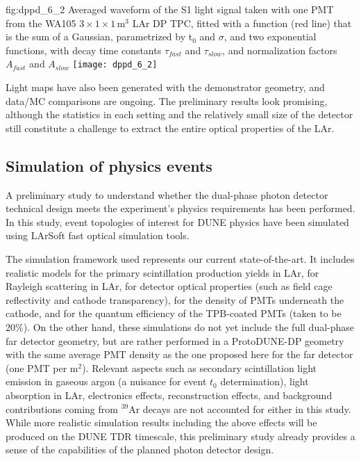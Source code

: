 \begin{dunefigure}{fig:dppd_6_2}
{Averaged waveform of the S1 light signal taken with one PMT from the WA105 $3\times1\times1$\,m$^3$ LAr DP TPC, fitted with a function (red line) that is the sum of a Gaussian, parametrized by t$_0$ and $\sigma$, and two exponential functions, with decay time constants $\tau_{fast}$ and $\tau_{slow}$, and normalization factors $A_{fast}$ and $A_{slow}$}
\texttt{[image: dppd\_6\_2]}
\end{dunefigure}

Light maps have also been generated with the demonstrator geometry, and data/MC comparisons are ongoing. The preliminary results look promising, although the statistics in each setting and the relatively small size of the detector still constitute a challenge to extract the entire optical properties of the LAr.


\subsection{Simulation of physics events}
\label{sec:fddp-pd-6.3}

A preliminary study to understand whether the dual-phase photon detector technical design meets the experiment's physics requirements has been performed. In this study, event topologies of interest for DUNE physics have been simulated using LArSoft fast optical simulation tools.

The simulation framework used represents our current state-of-the-art. It includes realistic models for the primary scintillation production yields in LAr, for Rayleigh scattering in LAr, for detector optical properties (such as field cage reflectivity and cathode transparency), for the density of PMTs underneath the cathode, and for the quantum efficiency of the TPB-coated PMTs (taken to be \num{20}\%). On the other hand, these simulations do not yet include the full dual-phase far detector geometry, but are rather performed in a ProtoDUNE-DP geometry with the same average PMT density as the one proposed here for the far detector (one PMT per m$^2$). Relevant aspects such as secondary scintillation light emission in gaseous argon (a nuisance for event $t_0$ determination), light absorption in LAr, electronics effects, reconstruction effects, and background contributions coming from $^{39}$Ar decays are not accounted for either in this study. While more realistic simulation results including the above effects will be produced on the DUNE TDR timescale, this preliminary study already provides a sense of the capabilities of the planned photon detector design.


